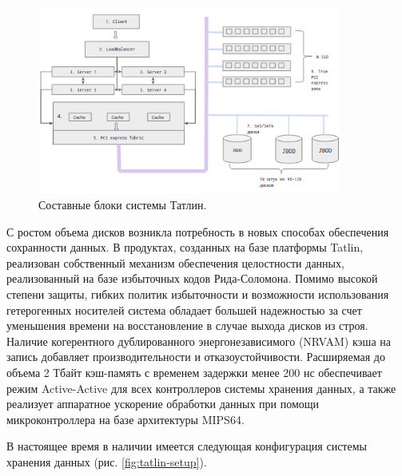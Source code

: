 \begin{figure}[!ht]
\centering
\includegraphics[width=10cm]{Kenenbek/images/tatlin.png}
\caption{Составные блоки системы Татлин.}
\label{fig:tatlin}
\end{figure}

\par 
С ростом объема дисков возникла потребность в новых способах обеспечения сохранности данных. В продуктах, созданных на базе платформы Tatlin, реализован собственный механизм обеспечения целостности данных, реализованный на базе избыточных кодов Рида-Соломона. Помимо высокой степени защиты, гибких политик избыточности и возможности использования гетерогенных носителей система обладает большей надежностью за счет уменьшения времени на восстановление в случае выхода дисков из строя. Наличие когерентного дублированного энергонезависимого (NRVAM) кэша на запись добавляет производительности и отказоустойчивости. Расширяемая до объема 2 Тбайт кэш-память с временем задержки менее 200 нс обеспечивает режим Active-Active для всех контроллеров системы хранения данных, а также реализует аппаратное ускорение обработки данных при помощи микроконтроллера на базе архитектуры MIPS64. 



В настоящее время в наличии имеется следующая конфигурация системы хранения данных (рис. \ref{fig:tatlin-setup}).

